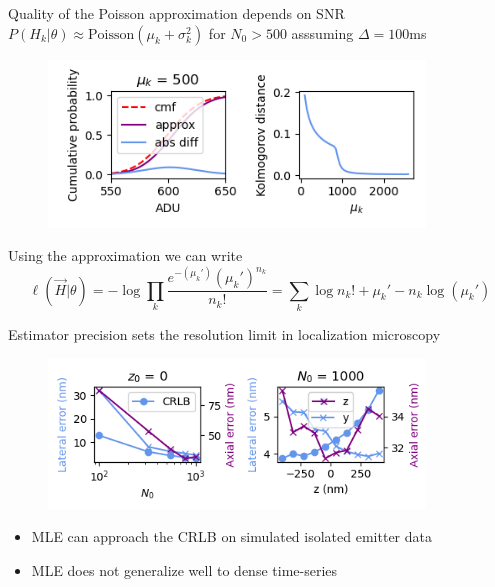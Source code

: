 \documentclass{beamer}					%
\begin{document}
\begin{frame}{Quality of the Poisson approximation depends on SNR}
$P(H_{k}|\theta)\approx \mathrm{Poisson}(\mu_{k}+\sigma_{k}^{2})$ for $N_{0} > 500$ asssuming $\Delta=100$ms 
\begin{figure}
\includegraphics[width=10cm]{Kolmogorov.png}
\end{figure}
Using the approximation we can write
\begin{equation*}
\ell(\vec{H}|\theta) = -\log \prod_{k} \frac{e^{-\left(\mu_{k}'\right)}\left(\mu_{k}'\right)^{n_{k}}}{n_{k}!} = \sum_{k}  \log n_{k}! + \mu_{k}' - n_{k}\log\left(\mu_{k}'\right)
\end{equation*}

\end{frame}

\begin{frame}{Estimator precision sets the resolution limit in localization microscopy}
\begin{figure}
\includegraphics[width=10cm]{Errors.png}
\end{figure}
\begin{itemize}
\item MLE can approach the CRLB on simulated isolated emitter data
\item MLE does not generalize well to dense time-series
\end{itemize}
\end{frame}
\end{document}

